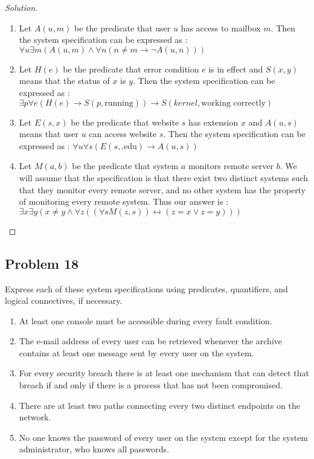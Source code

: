 \documentclass{article}
\newenvironment{solution}{\renewcommand\qedsymbol{}\begin{proof}[Solution]}{\end{proof}}
\begin{document}
\begin{solution}
\hspace{1pt}

\begin{enumerate}
\item Let $A(u,m)$ be the predicate that user $u$ has access to mailbox $m$. Then the system specification can be expressed as :\\$\forall u \exists m(A(u,m) \land \forall n(n \neq m \rightarrow \neg A(u,n)))$
\item Let $H(e)$ be the predicate that error condition $e$ is in effect and $S(x,y)$ means that the status of $x$ is $y$. Then the system specification can be expressed as : $\exists p \forall e(H(e) \rightarrow S(p,\textrm{running})) \rightarrow S(kernel,\textrm{working correctly})$
\item Let $E(s,x)$ be the predicate that website $s$ has extension $x$ and $A(u,s)$ means that user $u$ can access website $s$. Then the system specification can be expressed as : $\forall u \forall s(E(s,\textrm{.edu}) \rightarrow A(u,s))$
\item Let $M(a,b)$ be the predicate that system $a$ monitors remote server $b$. We will assume that the specification is that there exist two distinct systems such that they monitor every remote server, and no other system has the property of monitoring every remote system. Thus our answer is :\\$\exists x \exists y(x \neq y \land \forall z((\forall sM(z,s)) \leftrightarrow (z = x \lor z = y)))$
\end{enumerate}
\end{solution}

\clearpage
\subsection*{Problem 18}
Express each of these system specifications using predicates, quantifiers, and logical connectives, if necessary.

\begin{enumerate}[leftmargin=16pt, topsep = 8pt]
\item At least one console must be accessible during every fault condition.
\item The e-mail address of every user can be retrieved whenever the archive contains at least one message sent by every user on the system.
\item For every security breach there is at least one mechanism that can detect that breach if and only if there is a process that has not been compromised.
\item There are at least two paths connecting every two distinct endpoints on the network.
\item No one knows the password of every user on the system except for the system administrator, who knows all passwords.
\end{enumerate}
\end{document}

